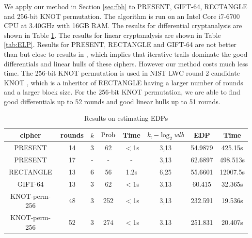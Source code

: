 We apply our method in Section \ref{sec:fbh} to PRESENT, GIFT-64, RECTANGLE and 256-bit KNOT permutation. The algorithm is run on an Intel Core i7-6700 CPU at 3.40GHz with 16GB RAM. The results for differential cryptanalysis are shown in Table \ref{tab:EDP}. The results for linear cryptanalysis are shown in Table \ref{tab:ELP}. Results for PRESENT, RECTANGLE and GIFT-64 are not better than but close to results in \cite{HV18}, which implies that iterative trails dominate the good differentials and linear hulls of these ciphers. However our method costs much less time. The 256-bit KNOT permutation is used in NIST LWC round 2 candidate KNOT \cite{ZDY19}, which is a inheritor of RECTANGLE having a larger number of rounds and a larger block size. For the 256-bit KNOT permutation, we are able to find good differentials up to 52 rounds and good linear hulls up to 51 rounds. 

\begin{table}
	\caption{Results on estimating EDPs}\label{tab:EDP}
	\centering
	\begin{tabular}{|c|c|c|c|c|c|c|c|}
		\hline
		cipher & rounds & $k$ & $\text{Prob}$ & Time & $k,-\log_2wlb$ & EDP & Time \\
		\hline
		PRESENT & 14 & 3 & 62 & $<$1s & 3,13 & 54.9879 & 425.15s \\
		\hline 
		PRESENT & 17 & - & - & - & 3,13 & 62.6897 & 498.513s\\
		\hline 
		RECTANGLE & 13 & 6 & 56 & 1.2s & 6,25 & 55.6601 & 12007.5s \\
		\hline
		GIFT-64 & 13 & 3 & 62 & $<$1s & 3,13 & 60.415 & 32.365s\\
		\hline
		KNOT-perm-256 & 48 & 3 & 252 & $<$1s & 3,13 & 232.591 & 19.536s\\
		\hline
		KNOT-perm-256 & 52 & 3 & 274 & $<$1s & 3,13 & 251.831 & 20.407s\\
		\hline
	\end{tabular}
\end{table}


